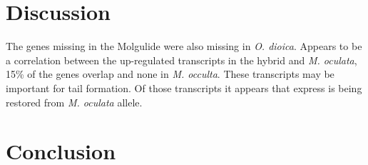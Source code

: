 \section{Discussion}
The genes missing in the Molgulide were also missing in \textit{O. dioica}.
Appears to be a correlation between the up-regulated transcripts in the hybrid and \textit{M. oculata}, 15\% of the genes overlap and none in \textit{M. occulta}. These transcripts may be important for tail formation. Of those transcripts it appears that express is being restored from \textit{M. oculata} allele. 
\section{Conclusion}
